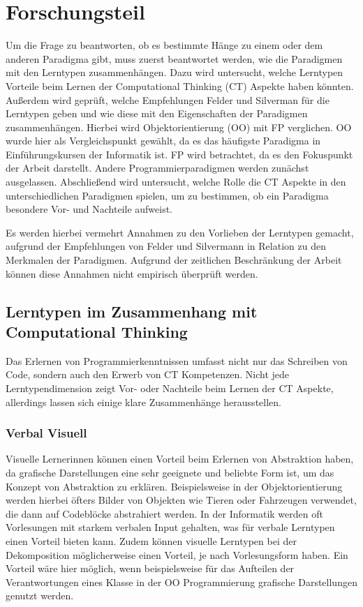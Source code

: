 \clearpage
\section{Forschungsteil}
\label{sec:work}

Um die Frage zu beantworten, ob es bestimmte Hänge zu einem oder dem anderen Paradigma gibt, muss zuerst beantwortet werden, wie die Paradigmen mit den Lerntypen zusammenhängen. 
Dazu wird untersucht, welche Lerntypen Vorteile beim Lernen der Computational Thinking (CT) Aspekte haben könnten. Außerdem wird geprüft, welche Empfehlungen Felder und Silverman für die Lerntypen geben und wie diese mit den Eigenschaften der Paradigmen zusammenhängen.
Hierbei wird Objektorientierung (OO) mit FP verglichen. OO wurde hier als Vergleichspunkt gewählt, da es das häufigste Paradigma in Einführungskursen der Informatik ist. FP wird betrachtet, da es den Fokuspunkt der Arbeit darstellt. Andere Programmierparadigmen werden zunächst ausgelassen.
Abschließend wird untersucht, welche Rolle die CT Aspekte in den unterschiedlichen Paradigmen spielen, um zu bestimmen, ob ein Paradigma besondere Vor- und Nachteile aufweist.

Es werden hierbei vermehrt Annahmen zu den Vorlieben der Lerntypen gemacht, aufgrund der Empfehlungen von Felder und Silvermann in Relation zu den Merkmalen der Paradigmen. Aufgrund der zeitlichen Beschränkung der Arbeit können diese Annahmen nicht empirisch überprüft werden.

\subsection{Lerntypen im Zusammenhang mit Computational Thinking}
Das Erlernen von Programmierkenntnissen umfasst nicht nur das Schreiben von Code, sondern auch den Erwerb von CT Kompetenzen.
Nicht jede Lerntypendimension zeigt Vor- oder Nachteile beim Lernen der CT Aspekte, allerdings lassen sich einige klare Zusammenhänge herausstellen.

\subsubsection{Verbal Visuell}
Visuelle Lernerinnen können einen Vorteil beim Erlernen von Abstraktion haben, da grafische Darstellungen eine sehr geeignete und beliebte Form ist, um das Konzept von Abstraktion zu erklären. Beispielsweise in der Objektorientierung werden hierbei öfters Bilder von Objekten wie Tieren oder Fahrzeugen verwendet, die dann auf Codeblöcke abstrahiert werden.
In der Informatik werden oft Vorlesungen mit starkem verbalen Input gehalten, was für verbale Lerntypen einen Vorteil bieten kann.
Zudem können visuelle Lerntypen bei der Dekomposition möglicherweise einen Vorteil, je nach Vorlesungsform haben. Ein Vorteil wäre hier möglich, wenn beispielsweise für das Aufteilen der Verantwortungen eines Klasse in der OO Programmierung grafische Darstellungen genutzt werden.

